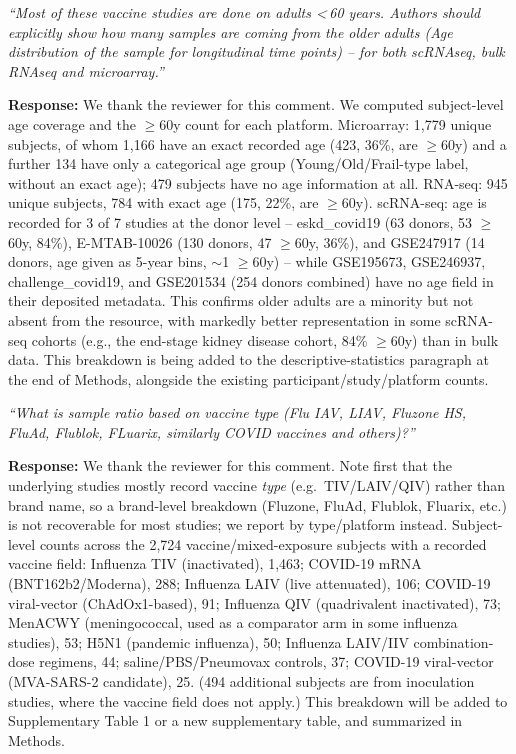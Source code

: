 \documentclass[11pt]{article}
\newcommand{\origcomment}[1]{\textit{``#1''}}
\newcommand{\filledresponse}[1]{%
  \par\medskip\noindent\textbf{Response:} #1\par
  \vspace{0.4cm}%
  \par\noindent\hrulefill\par\bigskip
}
\begin{document}
\begin{commentlist}
\item[R1-2.] \origcomment{Most of these vaccine studies are done on adults \textless\,60 years.
Authors should explicitly show how many samples are coming from the older adults (Age
distribution of the sample for longitudinal time points) -- for both scRNAseq, bulk RNAseq and
microarray.}
\filledresponse{We thank the reviewer for this comment. We computed subject-level age coverage and the $\geq$60y count for each platform.
Microarray: 1,779 unique subjects, of whom 1,166 have an exact recorded age (423, 36\%, are
$\geq$60y) and a further 134 have only a categorical age group (Young/Old/Frail-type label, without
an exact age); 479 subjects have no age information at all. RNA-seq: 945 unique subjects, 784 with
exact age (175, 22\%, are $\geq$60y). scRNA-seq: age is recorded for 3 of 7 studies at the donor
level -- eskd\_covid19 (63 donors, 53 $\geq$60y, 84\%), E-MTAB-10026 (130 donors, 47 $\geq$60y,
36\%), and GSE247917 (14 donors, age given as 5-year bins, $\sim$1 $\geq$60y) -- while GSE195673,
GSE246937, challenge\_covid19, and GSE201534 (254 donors combined) have no age field in their
deposited metadata. This confirms older adults are a minority but not absent from the resource, with
markedly better representation in some scRNA-seq cohorts (e.g., the end-stage kidney disease cohort,
84\% $\geq$60y) than in bulk data. This breakdown is being added to the descriptive-statistics
paragraph at the end of Methods, alongside the existing participant/study/platform counts.}

\item[R1-3.] \origcomment{What is sample ratio based on vaccine type (Flu IAV, LIAV, Fluzone HS,
FluAd, Flublok, FLuarix, similarly COVID vaccines and others)?}
\filledresponse{We thank the reviewer for this comment. Note first that the underlying studies mostly record vaccine \emph{type} (e.g.\
TIV/LAIV/QIV) rather than brand name, so a brand-level breakdown (Fluzone, FluAd, Flublok, Fluarix,
etc.) is not recoverable for most studies; we report by type/platform instead. Subject-level
counts across the 2,724 vaccine/mixed-exposure subjects with a recorded vaccine field: Influenza TIV
(inactivated), 1,463; COVID-19 mRNA (BNT162b2/Moderna), 288; Influenza LAIV (live attenuated), 106;
COVID-19 viral-vector (ChAdOx1-based), 91; Influenza QIV (quadrivalent inactivated), 73; MenACWY
(meningococcal, used as a comparator arm in some influenza studies), 53; H5N1 (pandemic influenza),
50; Influenza LAIV/IIV combination-dose regimens, 44; saline/PBS/Pneumovax controls, 37; COVID-19
viral-vector (MVA-SARS-2 candidate), 25. (494 additional subjects are from inoculation studies, where
the vaccine field does not apply.) This breakdown will be added to Supplementary Table 1 or a new
supplementary table, and summarized in Methods.}


\end{commentlist}
\end{document}
